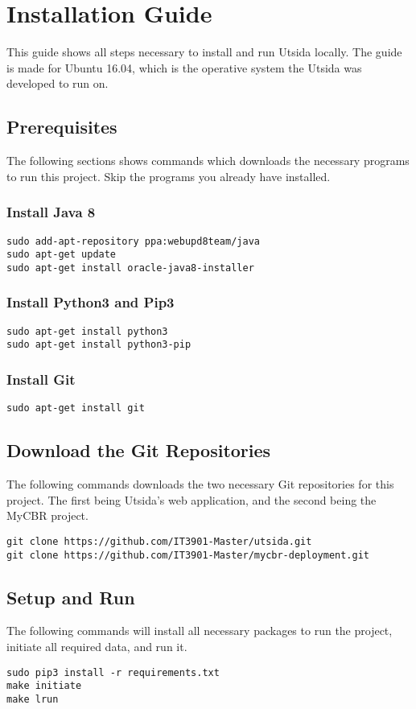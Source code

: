 \chapter{Installation Guide}\label{app:installation_guide}
This guide shows all steps necessary to install and run Utsida locally. The guide is made for Ubuntu 16.04, which is the operative system the Utsida was developed to run on.

\section*{Prerequisites}
The following sections shows commands which downloads the necessary programs to run this project. Skip the programs you already have installed.

\subsection*{Install Java 8}
\begin{verbatim}
sudo add-apt-repository ppa:webupd8team/java
sudo apt-get update
sudo apt-get install oracle-java8-installer
\end{verbatim}

\subsection*{Install Python3 and Pip3}
\begin{verbatim}
sudo apt-get install python3                                       
sudo apt-get install python3-pip   
\end{verbatim}

\subsection*{Install Git}
\begin{verbatim}
sudo apt-get install git   
\end{verbatim}

\section*{Download the Git Repositories}
The following commands downloads the two necessary Git repositories for this project. The first being Utsida's web application, and the second being the MyCBR project.

\begin{verbatim}
git clone https://github.com/IT3901-Master/utsida.git              
git clone https://github.com/IT3901-Master/mycbr-deployment.git    
\end{verbatim}


\section*{Setup and Run}
The following commands will install all necessary packages to run the project, initiate all required data, and run it.

\begin{verbatim}
sudo pip3 install -r requirements.txt
make initiate
make lrun 
\end{verbatim}

